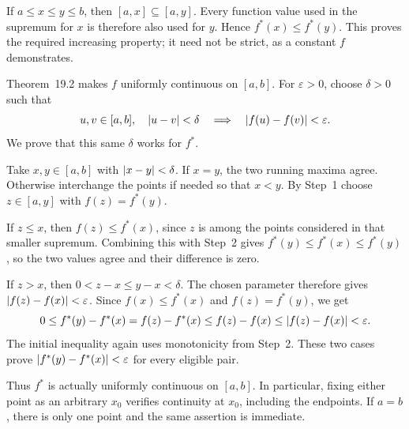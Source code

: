 If $a\le x\le y\le b$, then $[a,x]\subseteq[a,y]$.
Every function value used in the supremum for $x$ is therefore
also used for $y$. Hence $f^*(x)\le f^*(y)$. This proves
the required increasing property; it need not be strict,
as a constant $f$ demonstrates.

Theorem~19.2 makes $f$ uniformly continuous on $[a,b]$.
For $\varepsilon>0$, choose $\delta>0$ such that
\[
 u,v\in[a,b],\quad\left|u-v\right|<\delta
 \quad\Longrightarrow\quad\left|f(u)-f(v)\right|<\varepsilon.
\]
We prove that this same $\delta$ works for $f^*$.

Take $x,y\in[a,b]$ with $\left|x-y\right|<\delta$.
If $x=y$, the two running maxima agree. Otherwise interchange
the points if needed so that $x<y$. By Step~1 choose
$z\in[a,y]$ with $f(z)=f^*(y)$.

If $z\le x$, then $f(z)\le f^*(x)$, since $z$ is among
the points considered in that smaller supremum. Combining this
with Step~2 gives $f^*(y)\le f^*(x)\le f^*(y)$, so the
two values agree and their difference is zero.

If $z>x$, then $0<z-x\le y-x<\delta$. The chosen parameter
therefore gives $\left|f(z)-f(x)\right|<\varepsilon$.
Since $f(x)\le f^*(x)$ and $f(z)=f^*(y)$, we get
\[
 0\le f^*(y)-f^*(x)
 =f(z)-f^*(x)
 \le f(z)-f(x)
 \le\left|f(z)-f(x)\right|<\varepsilon.
\]
The initial inequality again uses monotonicity from Step~2.
These two cases prove
$\left|f^*(y)-f^*(x)\right|<\varepsilon$ for every eligible pair.

Thus $f^*$ is actually uniformly continuous on $[a,b]$.
In particular, fixing either point as an arbitrary $x_0$ verifies
continuity at $x_0$, including the endpoints. If $a=b$, there
is only one point and the same assertion is immediate.
